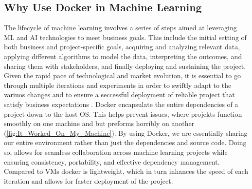 \subsection{Why Use Docker in Machine Learning}
The lifecycle of machine learning involves a series of steps aimed at leveraging \ac{ML} and \ac{AI} technologies to meet business goals.
This include the initial setting of both business and project-specific goals, acquiring and analyzing relevant data, applying different algorithms to model the data, interpreting the outcomes, and sharing them with stakeholders, and finally deploying and sustaining the project.
Given the rapid pace of technological and market evolution, it is essential to go through multiple iterations and experiments in order to swiftly adapt to the variuos changes and to ensure a seccessful deployment of reliable project that satisfy business expectations \cite{Docker_Archi}.
\newline
Docker encapsulate the entire dependencies of a project down to the host \ac*{OS}. This helps prevent issues,
where projekts function smoothly on one machine and but preforms horribly on another (\autoref{fig:It_Worked_On_My_Machine}).
By using Docker, we are essentially sharing our entire environment rather than just the dependencies and source code.
Doing so, allows for seamless collaboration across machine learning projects while ensuring consistency, portability, and effective dependency management.
Compared to \ac*{VMs} docker is lightweight, which in turn inhances the speed of each iteration and allows for faster deployment of the project.



